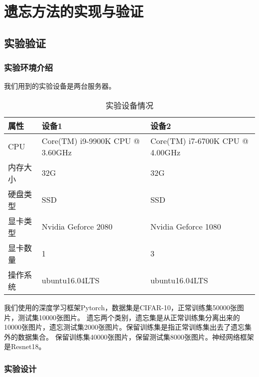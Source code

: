 
\chapter{遗忘方法的实现与验证}

\section{实验验证}

\subsection{实验环境介绍}
我们用到的实验设备是两台服务器。
\begin{table}
    \centering
    \caption{实验设备情况}
    \begin{tabular}{lll}
      \toprule
      属性  & 设备1 & 设备2  \\
      \midrule
      CPU   & Core(TM) i9-9900K CPU @ 3.60GHz & Core(TM) i7-6700K CPU @ 4.00GHz \\
      内存大小  & 32G & 32G                    \\
      硬盘类型 & SSD  & SSD  \\
      显卡类型 & Nvidia Geforce 2080  & Nvidia Geforce 1080  \\
      显卡数量 & 1  & 3  \\
      操作系统 & ubuntu16.04LTS  & ubuntu16.04LTS  \\
      \bottomrule
    \end{tabular}
    \label{tab:model-attack-difference}
\end{table}

我们使用的深度学习框架Pytorch，数据集是CIFAR-10\cite{cifar10_2009}，正常训练集50000张图片，测试集10000张图片。
遗忘两个类别，遗忘集是从正常训练集分离出来的10000张图片，遗忘测试集2000张图片。保留训练集是指正常训练集出去了遗忘集外的数据集合。
保留训练集40000张图片，保留测试集8000张图片。神经网络框架是Resnet18\cite{He_2016_CVPR}。

\subsection{实验设计}
